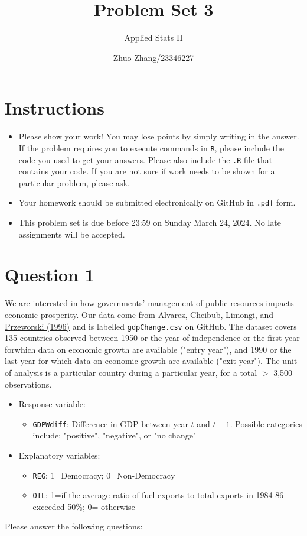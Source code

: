 \documentclass[12pt,letterpaper]{article}
\title{Problem Set 3}
\date{Zhuo Zhang/23346227}
\author{Applied Stats II}
\begin{document}
	\maketitle
	\section*{Instructions}
	\begin{itemize}
	\item Please show your work! You may lose points by simply writing in the answer. If the problem requires you to execute commands in \texttt{R}, please include the code you used to get your answers. Please also include the \texttt{.R} file that contains your code. If you are not sure if work needs to be shown for a particular problem, please ask.
\item Your homework should be submitted electronically on GitHub in \texttt{.pdf} form.
\item This problem set is due before 23:59 on Sunday March 24, 2024. No late assignments will be accepted.
	\end{itemize}

	\vspace{.25cm}
\section*{Question 1}
\vspace{.25cm}
\noindent We are interested in how governments' management of public resources impacts economic prosperity. Our data come from \href{https://www.researchgate.net/profile/Adam_Przeworski/publication/240357392_Classifying_Political_Regimes/links/0deec532194849aefa000000/Classifying-Political-Regimes.pdf}{Alvarez, Cheibub, Limongi, and Przeworski (1996)} and is labelled \texttt{gdpChange.csv} on GitHub. The dataset covers 135 countries observed between 1950 or the year of independence or the first year forwhich data on economic growth are available ("entry year"), and 1990 or the last year for which data on economic growth are available ("exit year"). The unit of analysis is a particular country during a particular year, for a total $>$ 3,500 observations. 

\begin{itemize}
	\item
	Response variable: 
	\begin{itemize}
		\item \texttt{GDPWdiff}: Difference in GDP between year $t$ and $t-1$. Possible categories include: "positive", "negative", or "no change"
	\end{itemize}
	\item
	Explanatory variables: 
	\begin{itemize}
		\item
		\texttt{REG}: 1=Democracy; 0=Non-Democracy
		\item
		\texttt{OIL}: 1=if the average ratio of fuel exports to total exports in 1984-86 exceeded 50\%; 0= otherwise
	\end{itemize}
	
\end{itemize}
\newpage
\noindent Please answer the following questions:
\end{document}
